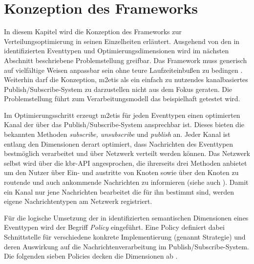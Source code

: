 \chapter{Konzeption des Frameworks}
\label{chap:konzeption_pubsub}
In diesem Kapitel wird die Konzeption des Frameworks zur Verteilungsoptimierung in seinen Einzelheiten erläutert. Ausgehend von den in \cite{Ficher2010a} identifizierten Eventtypen und Optimierungsdimensionen wird im nächsten Abschnitt beschriebene Problemstellung greifbar. Das Framework muss generisch auf vielfältige Weisen anpassbar sein ohne teure Laufzeiteinbußen zu bedingen \cite{NEW_PAPER} . Weiterhin darf die Konzeption, \ac{m2etis} als ein einfach zu nutzendes kanalbasiertes Publish/Subscribe-System zu darzustellen nicht aus dem Fokus geraten. Die Problemstellung führt zum Verarbeitungsmodell das beispielhaft getestet wird.

Im Optimierungsschritt erzeugt \ac{m2etis} für jeden Eventtypen einen optimierten Kanal der über das Publish/Subscribe-System ansprechbar ist. Dieses bieten die bekannten Methoden \emph{subscribe, unsubscribe} und \emph{publish} an. Jeder Kanal ist entlang den Dimensionen derart optimiert, dass Nachrichten des Eventtypen bestmöglich verarbeitet und über Netzwerk verteilt werden können. Das Netzwerk selbst wird über die \ac{kbr}-API angesprochen, die ihrerseits drei Methoden anbietet um den Nutzer über Ein- und austritte von Knoten sowie über den Knoten zu routende und auch ankommende Nachrichten zu informieren \cite{Dabek2003Towards} (siehe auch ). Damit ein Kanal nur jene Nachrichten bearbeitet die für ihn bestimmt sind, werden eigene Nachrichtentypen am Netzwerk registriert.

Für die logische Umsetzung der in \cite{Fischer2010Event} identifizierten semantischen Dimensionen eines Eventtypen wird der Begriff \emph{Policy} eingeführt. Eine Policy definiert dabei Schnittstelle für verschiedene konkrete Implementierung (genannt Strategie) und deren Auswirkung auf die Nachrichtenverarbeitung im Publish/Subscribe-System. Die folgenden sieben Policies decken die Dimensionen ab \cite{NEW_PAPER}.

